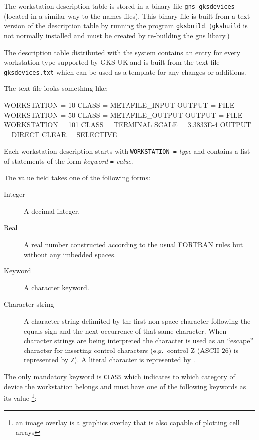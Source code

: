 \documentclass[twoside,11pt,nolof]{starlink}
\begin{document}
The workstation description table is stored in a binary file
\texttt{gns\_gksdevices} (located in a similar way to the names files).
This binary file is built from a text version of the
description table by running the program \texttt{gksbuild}. (\texttt{gksbuild}
is not normally installed and must be created by re-building the
gns libary.)

The description table distributed with the system contains an entry for every
workstation type supported by GKS-UK and is built from the text file \texttt{gksdevices.txt} which can be used as a template for any changes or
additions.

The text file looks something like:

\begin{terminalv}
WORKSTATION = 10
  CLASS = METAFILE_INPUT
  OUTPUT =  FILE
WORKSTATION = 50
  CLASS = METAFILE_OUTPUT
  OUTPUT = FILE
WORKSTATION = 101
  CLASS = TERMINAL
  SCALE = 3.3833E-4
  OUTPUT = DIRECT
  CLEAR = SELECTIVE
\end{terminalv}

Each workstation description starts with \texttt{WORKSTATION =} \emph{type} and
contains a list of statements of the form \emph{keyword} \texttt{=} \emph{value}.

The value field takes one of the following forms:
\begin{description}
\item[Integer] A decimal integer.
\item[Real] A real number constructed according to the usual FORTRAN rules but
without any imbedded spaces.
\item[Keyword] A character keyword.
\item[Character string] A character string delimited by the first non-space
character following the equals sign and the next occurrence of that same
character.
When character strings are being interpreted the \texttt{\wedge} character is used
as an ``escape'' character for inserting control characters (e.g.\ control Z
(ASCII 26) is represented by \texttt{\wedge Z}). A literal \texttt{\wedge} character
is represented by \texttt{\wedge\wedge}.
\end{description}

The only mandatory keyword is \texttt{CLASS} which indicates to which category of
device the workstation belongs and must have one of the following
keywords as its value \footnote{an image overlay is a graphics overlay
that is also capable of plotting cell arrays}:
\end{document}
